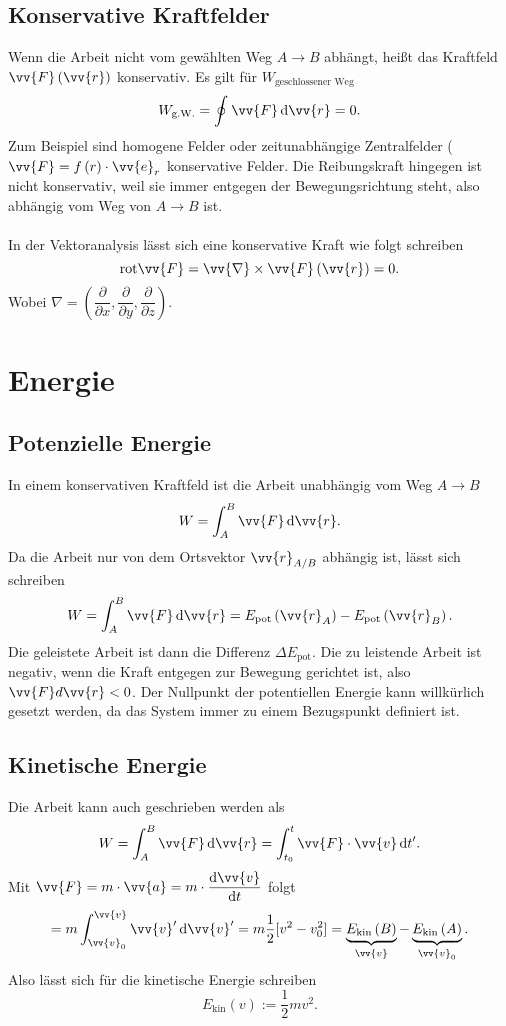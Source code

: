 \documentclass[a4paper,12pt]{article}
\newcommand{\td}{\,\text{d}}
\numberwithin{equation}{section}
\begin{document}
\subsection{Konservative Kraftfelder}
Wenn die Arbeit nicht vom gewählten Weg $A\rightarrow B$ abhängt, heißt das Kraftfeld $\vv{F}\left(\vv{r}\right)$ konservativ. Es gilt für $W_{\text{geschlossener Weg}}$ 
\[ 
        W_{\text{g.W.}}=\oint_{}^{}\vv{F}\td\vv{r}=0
.\] 
Zum Beispiel sind homogene Felder oder zeitunabhängige Zentralfelder ($\vv{F}=f\left(r\right)\cdot \vv{e}_r$  konservative Felder. Die Reibungskraft hingegen ist nicht konservativ, weil sie immer entgegen der Bewegungsrichtung steht, also abhängig vom Weg von $A\rightarrow B$ ist.\\\\
In der Vektoranalysis lässt sich eine konservative Kraft wie folgt schreiben
\[ 
        \text{rot}\vv{F}=\vv{\nabla }\times\vv{F}\left(\vv{r}\right)=0
.\] 
Wobei $\nabla=\left(\dfrac{\partial }{\partial x},\dfrac{\partial }{\partial y},\dfrac{\partial }{\partial z}\right)$.

\section{Energie}

\subsection{Potenzielle Energie}
In einem konservativen Kraftfeld ist die Arbeit unabhängig vom Weg $A\rightarrow B$ 
\[ 
        W=\int_{A}^{B}\vv{F}\td\vv{r}
.\] 
Da die Arbeit nur von dem Ortsvektor $\vv{r}_{A/B}$ abhängig ist, lässt sich schreiben
\[ 
        W=\int_{A}^{B}\vv{F}\td\vv{r}=E_{\text{pot}}\left(\vv{r}_A\right)-E_{\text{pot}}\left(\vv{r}_B\right)
.\] 
Die geleistete Arbeit ist dann die Differenz $\Delta E_{\text{pot}}$. Die zu leistende Arbeit ist negativ, wenn die Kraft entgegen zur Bewegung gerichtet ist, also $\vv{F}d\vv{r}<0$. Der Nullpunkt der potentiellen Energie kann willkürlich gesetzt werden, da das System immer zu einem Bezugspunkt definiert ist.

\subsection{Kinetische Energie}
Die Arbeit kann auch geschrieben werden als
\[ 
        W=\int_{A}^{B}\vv{F}\td\vv{r}=\int_{t_0}^{t}\vv{F}\cdot \vv{v}\td t'
.\] 
Mit $\vv{F}=m\cdot \vv{a}=m\cdot \dfrac{\text{d}\vv{v}}{\text{d}t}$ folgt
\[ 
        =m\int_{\vv{v}_0}^{\vv{v}}\vv{v}'\td\vv{v}'=m\dfrac{1}{2}[v^2-v_0^2]=\underbrace{E_{\text{kin}}\left(B\right)}_{\vv{v}}-\underbrace{E_{\text{kin}}\left(A\right)}_{\vv{v}_0}
.\] 
Also lässt sich für die kinetische Energie schreiben
\[ 
        E_{\text{kin}}\left(v\right):=\dfrac{1}{2}mv^2
.\] 
\end{document}
